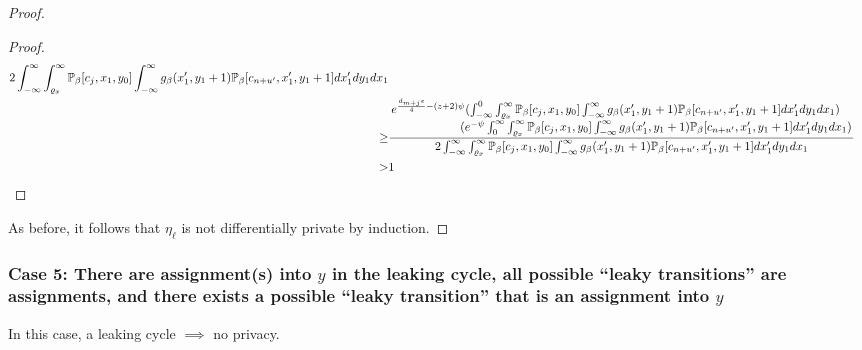 \begin{proof}
\begin{proof}
\begin{align*}
			{2\int_{-\infty}^{\infty}\int_{\varrho_x}^\infty\PP_\beta[c_{j}, x_1, y_0]\int_{-\infty}^\infty g_\beta(x_1', y_1+1)\PP_\beta[c_{n+u'}, x_1', y_1+1] dx_1' dy_1dx_1}\\
			\geq& \frac{\splitfrac{e^{\frac{d_{m+j}\varepsilon}{4}-(z+2)\psi}(\int_{-\infty}^{0}\int_{\varrho_x}^\infty\PP_\beta[c_{j}, x_1, y_0]\int_{-\infty}^\infty g_\beta(x_1', y_1+1)\PP_\beta[c_{n+u'}, x_1', y_1+1] dx_1' dy_1dx_1)}{(e^{-\psi}\int_{0}^{\infty}\int_{\varrho_x}^\infty\PP_\beta[c_{j}, x_1, y_0]\int_{-\infty}^\infty g_\beta(x_1', y_1+1)\PP_\beta[c_{n+u'}, x_1', y_1+1] dx_1' dy_1dx_1)}}
			{2\int_{-\infty}^{\infty}\int_{\varrho_x}^\infty\PP_\beta[c_{j}, x_1, y_0]\int_{-\infty}^\infty g_\beta(x_1', y_1+1)\PP_\beta[c_{n+u'}, x_1', y_1+1] dx_1' dy_1dx_1}\\
			>&1
		\end{align*}
	\end{proof}

	As before, it follows that $\eta_\ell$ is not differentially private by induction. 

\end{proof}

\subsubsection{Case 5: There are assignment(s) into $y$ in the leaking cycle, all possible ``leaky transitions'' are assignments, and there exists a possible ``leaky transition'' that is an assignment into $y$}

\begin{thm}
	In this case, a leaking cycle $\implies$ no privacy.
\end{thm}

